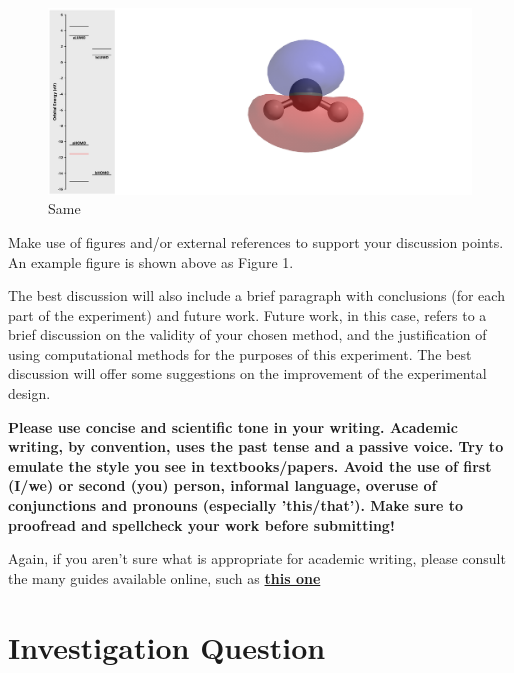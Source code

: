 \documentclass[twocolumn]{article} %
\begin{document}
\begin{figure}[h!]
\centering
\includegraphics[width=0.95\columnwidth]{CH2 HOMO-1.png} %
\vspace{2mm} %
\caption{Same}
\end{figure}

Make use of figures and/or external references to support your discussion points. An example figure is shown above as Figure 1.

The best discussion will also include a brief paragraph with conclusions (for each part of the experiment) and future work. Future work, in this case, refers to a brief discussion on the validity of your chosen method, and the justification of using computational methods for the purposes of this experiment. The best discussion will offer some suggestions on the improvement of the experimental design.

\textbf{Please use concise and scientific tone in your writing. Academic writing, by convention, uses the past tense and a passive voice. Try to emulate the style you see in textbooks/papers. Avoid the use of first (I/we) or second (you) person, informal language, overuse of conjunctions and pronouns (especially 'this/that'). Make sure to proofread and spellcheck your work before submitting!}

Again, if you aren't sure what is appropriate for academic writing, please consult the many guides available online, such as \href{https://libguides.reading.ac.uk/writing/style}{\textbf{this one}}





\section{Investigation Question}
\end{document}
